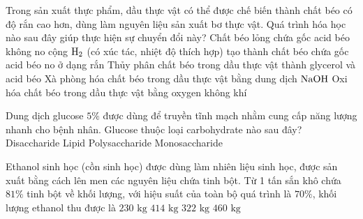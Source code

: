 \documentclass[11pt,a4paper]{article}
\begin{document}
\begin{ex}
Trong sản xuất thực phẩm, dầu thực vật có thể được chế biến thành chất béo có độ rắn cao hơn, dùng làm nguyên liệu sản xuất bơ thực vật. Quá trình hóa học nào sau đây giúp thực hiện sự chuyển đổi này?
\choice
{\True Chất béo lỏng chứa gốc acid béo không no cộng $\ce{H2}$ (có xúc tác, nhiệt độ thích hợp) tạo thành chất béo chứa gốc acid béo no ở dạng rắn}
{Thủy phân chất béo trong dầu thực vật thành glycerol và acid béo}
{Xà phòng hóa chất béo trong dầu thực vật bằng dung dịch $\ce{NaOH}$}
{Oxi hóa chất béo trong dầu thực vật bằng oxygen không khí}



\end{ex}

\begin{ex}
Dung dịch glucose $5\%$ được dùng để truyền tĩnh mạch nhằm cung cấp năng lượng nhanh cho bệnh nhân. Glucose thuộc loại carbohydrate nào sau đây?
\choice
{Disaccharide}
{Lipid}
{Polysaccharide}
{\True Monosaccharide}



\end{ex}

\begin{ex}
Ethanol sinh học (cồn sinh học) được dùng làm nhiên liệu sinh học, được sản xuất bằng cách lên men các nguyên liệu chứa tinh bột. Từ 1 tấn sắn khô chứa $81\%$ tinh bột về khối lượng, với hiệu suất của toàn bộ quá trình là $70\%$, khối lượng ethanol thu được là
\choice
{$230\text{ kg}$}
{$414\text{ kg}$}
{\True $322\text{ kg}$}
{$460\text{ kg}$}



\end{ex}
\end{document}
